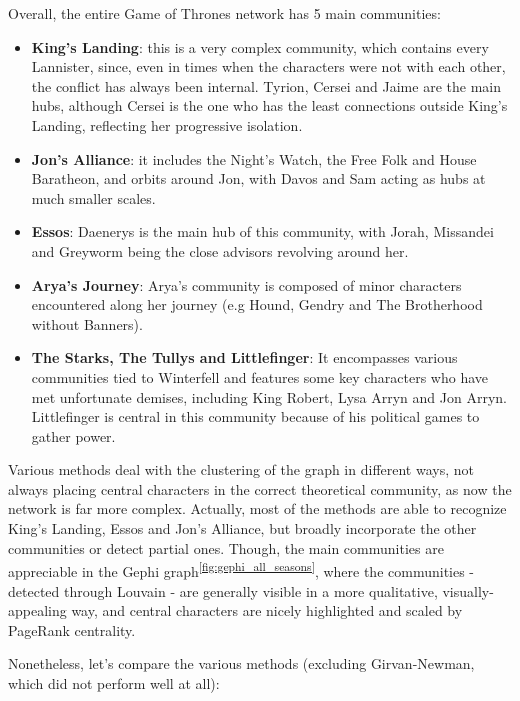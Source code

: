 \documentclass[10pt,twocolumn,letterpaper]{article}
\begin{document}
Overall, the entire Game of Thrones network has 5 main communities:

\begin{itemize}
    \item \textbf{King's Landing}: this is a very complex community, which contains every Lannister, since, even in times when the characters were not with each other, the conflict has always been internal. Tyrion, Cersei and Jaime are the main hubs, although Cersei is the one who has the least connections outside King's Landing, reflecting her progressive isolation.
    \item \textbf{Jon's Alliance}: it includes the Night’s Watch, the Free Folk and House Baratheon, and orbits around Jon, with Davos and Sam acting as hubs at much smaller scales.
    \item \textbf{Essos}: Daenerys is the main hub of this community, with Jorah, Missandei and Greyworm being the close advisors revolving around her. 
    \item \textbf{Arya's Journey}: Arya's community is composed of minor characters encountered along her journey (e.g Hound, Gendry and The Brotherhood without Banners).
    \item \textbf{The Starks, The Tullys and Littlefinger}: It encompasses various communities tied to Winterfell and features some key characters who have met unfortunate demises, including King Robert, Lysa Arryn and Jon Arryn. Littlefinger is central in this community because of his political games to gather power.
\end{itemize}

Various methods deal with the clustering of the graph in different ways, not always placing central characters in the correct theoretical community, as now the network is far more complex. Actually, most of the methods are able to recognize King's Landing, Essos and Jon's Alliance, but broadly incorporate the other communities or detect partial ones. Though, the main communities are appreciable in the Gephi graph\textsuperscript{\ref{fig:gephi_all_seasons}}, where the communities - detected through Louvain - are generally visible in a more qualitative, visually-appealing way, and central characters are nicely highlighted and scaled by PageRank centrality.

Nonetheless, let's compare the various methods (excluding Girvan-Newman, which did not perform well at all):
\end{document}
